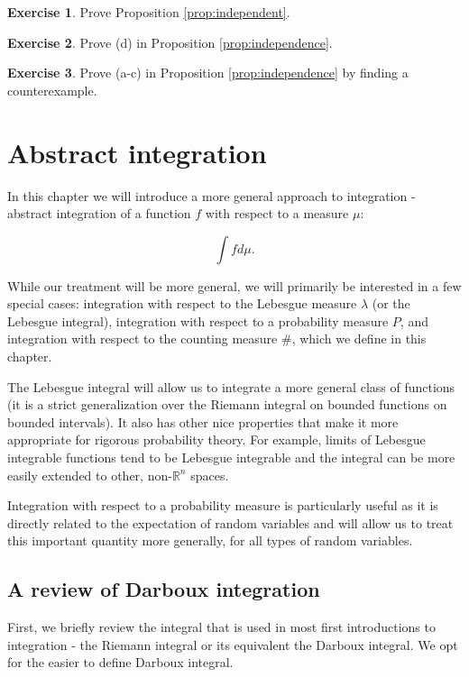 \documentclass{book}
\theoremstyle{plain}%
\theoremstyle{definition}
\newtheorem{exercise}{Exercise}[chapter]
\begin{document}
\begin{exercise}
Prove Proposition \ref{prop:independent}.
\end{exercise}

\begin{exercise}
Prove (d) in Proposition \ref{prop:independence}.
\end{exercise}

\begin{exercise}
Prove (a-c) in Proposition \ref{prop:independence} by finding a counterexample.
\end{exercise}


\chapter{Abstract integration}\label{ch:abstract}

In this chapter we will introduce a more general approach to integration - abstract integration of a function $f$ with respect to a measure $\mu$:

$$\int f d\mu.$$

While our treatment will be more general, we will primarily be interested in a few special cases: integration with respect to the Lebesgue measure $\lambda$ (or the Lebesgue integral), integration with respect to a probability measure $P$, and integration with respect to the counting measure $\#$, which we define in this chapter.

The Lebesgue integral will allow us to integrate a more general class of functions (it is a strict generalization over the Riemann integral on bounded functions on bounded intervals). It also has other nice properties that make it more appropriate for rigorous probability theory. For example, limits of Lebesgue integrable functions tend to be Lebesgue integrable and the integral can be more easily extended to other, non-$\mathbb{R}^n$ spaces.

Integration with respect to a probability measure is particularly useful as it is directly related to the expectation of random variables and will allow us to treat this important quantity more generally, for all types of random variables.

\section{A review of Darboux integration}

First, we briefly review the integral that is used in most first introductions to integration - the Riemann integral or its equivalent the Darboux integral. We opt for the easier to define Darboux integral.
\end{document}
